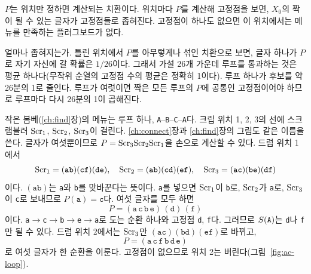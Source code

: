 $P$는 위치만 정하면 계산되는 치환이다. 위치마다 $P$를 계산해 고정점을 보면, $X_0$의 짝이 될 수 있는 글자가 고정점들로
좁혀진다. 고정점이 하나도 없으면 이 위치에서는 메뉴를 만족하는 플러그보드가 없다.

얼마나 좁혀지는가. 틀린 위치에서 $P$를 아무렇게나 섞인 치환으로 보면, 글자 하나가 $P$로 자기 자신에 갈 확률은
$1/26$이다. 그래서 가설 26개 가운데 루프를 통과하는 것은 평균 하나다(무작위 순열의 고정점 수의 평균은 정확히 1이다).
루프 하나가 후보를 약 26분의 1로 줄인다. 루프가 여럿이면 짝은 모든 루프의 $P$에 공통인 고정점이어야 하므로 루프마다
다시 26분의 1이 곱해진다.

\Ours 작은 봄베(\ref{ch:find}장)의 메뉴는 루프 하나, \texttt{A}--\texttt{B}--\texttt{C}--\texttt{A}다. 크립 위치 1, 2, 3의
선에 스크램블러 $\mathrm{Scr}_1$, $\mathrm{Scr}_2$, $\mathrm{Scr}_3$이 걸린다. \ref{ch:connect}장과 \ref{ch:find}장의 그림도 같은 이름을 쓴다. 글자가 여섯뿐이므로 $P = \mathrm{Scr}_3\mathrm{Scr}_2\mathrm{Scr}_1$을 손으로 계산할 수 있다. 드럼 위치 1에서
\[
  \mathrm{Scr}_1 = (\mathtt{ab})(\mathtt{cf})(\mathtt{de}),\quad \mathrm{Scr}_2 = (\mathtt{ab})(\mathtt{cd})(\mathtt{ef}),\quad
  \mathrm{Scr}_3 = (\mathtt{ac})(\mathtt{be})(\mathtt{df})
\]
이다. $(\mathtt{ab})$는 \texttt{a}와 \texttt{b}를 맞바꾼다는 뜻이다. \texttt{a}를 넣으면 $\mathrm{Scr}_1$이 \texttt{b}로,
$\mathrm{Scr}_2$가 \texttt{a}로, $\mathrm{Scr}_3$이 \texttt{c}로 보내므로 $P(\mathtt{a}) = \mathtt{c}$다. 여섯 글자를 모두 하면
\[
  P = (\mathtt{a}\,\mathtt{c}\,\mathtt{b}\,\mathtt{e})\,(\mathtt{d})\,(\mathtt{f})
\]
이다. \texttt{a}$\to$\texttt{c}$\to$\texttt{b}$\to$\texttt{e}$\to$\texttt{a}로 도는 순환 하나와 고정점 \texttt{d},
\texttt{f}다. 그러므로 $S(\mathtt{A})$는 \texttt{d}나 \texttt{f}만 될 수 있다. 드럼 위치 2에서는 $\mathrm{Scr}_3$만
$(\mathtt{ac})(\mathtt{bd})(\mathtt{ef})$로 바뀌고,
\[
  P = (\mathtt{a}\,\mathtt{c}\,\mathtt{f}\,\mathtt{b}\,\mathtt{d}\,\mathtt{e})
\]
로 여섯 글자가 한 순환을 이룬다. 고정점이 없으므로 위치 2는 버린다(그림~\ref{fig:ac-loop}).

